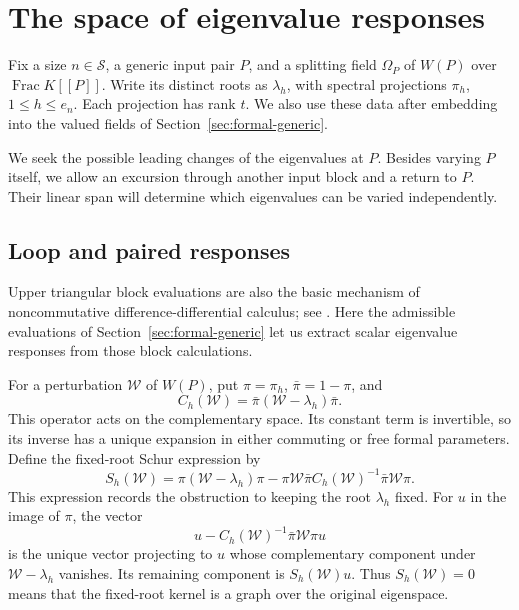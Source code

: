 \section{The space of eigenvalue responses}\label{sec:responses}

Fix a size $n\in\mathcal S$, a generic input pair $P$, and a splitting
field $\Omega_P$ of $W(P)$ over $\operatorname{Frac}K[[P]]$.
Write its distinct roots as $\lambda_h$, with spectral projections
$\pi_h$, $1\le h\le e_n$.  Each projection has rank $t$.
We also use these data after embedding into the valued fields of
Section~\ref{sec:formal-generic}.

We seek the possible leading changes of the eigenvalues at $P$.
Besides varying $P$ itself, we allow an excursion through another
input block and a return to $P$.  Their linear span will determine
which eigenvalues can be varied independently.

\subsection{Loop and paired responses}\label{subsec:response-formulas}

Upper triangular block evaluations are also the basic mechanism of
noncommutative difference-differential calculus; see
\cite[Proposition~2.2 and Theorem~3.11]{KaliuzhnyiVerbovetskyiVinnikov2014}.
Here the admissible evaluations of Section~\ref{sec:formal-generic}
let us extract scalar eigenvalue responses from those block calculations.

For a perturbation $\mathcal W$ of $W(P)$, put $\pi=\pi_h$,
$\bar\pi=1-\pi$, and
\[
 C_h(\mathcal W)=\bar\pi(\mathcal W-\lambda_h)\bar\pi.
\]
This operator acts on the complementary space. Its constant term is
invertible, so its inverse has a unique expansion in either commuting
or free formal parameters. Define the fixed-root Schur expression by
\begin{equation}
S_h(\mathcal W)=
 \pi(\mathcal W-\lambda_h)\pi
 -\pi\mathcal W\bar\pi
  C_h(\mathcal W)^{-1}
  \bar\pi\mathcal W\pi.
 \label{eq:fixed-schur}
\end{equation}
This expression records the obstruction to keeping the root $\lambda_h$
fixed. For $u$ in the image of $\pi$, the vector
\[
 u-C_h(\mathcal W)^{-1}\bar\pi\mathcal W\pi u
\]
is the unique vector projecting to $u$ whose complementary component
under $\mathcal W-\lambda_h$ vanishes. Its remaining component is
$S_h(\mathcal W)u$. Thus $S_h(\mathcal W)=0$ means that the fixed-root
kernel is a graph over the original eigenspace.

